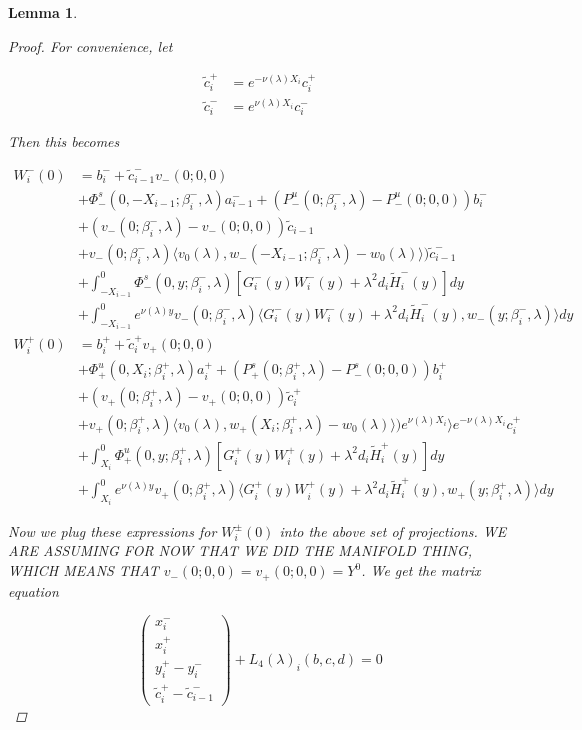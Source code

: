 \documentclass[12pt]{article}
\newtheorem{lemma}{Lemma}
\begin{document}
\begin{lemma}
\begin{proof}
For convenience, let

\begin{align*}
\tilde{c}_i^+ &= e^{-\nu(\lambda)X_i} c_i^+ \\ 
\tilde{c}_i^- &= e^{\nu(\lambda)X_i} c_i^-
\end{align*}

Then this becomes

\begin{align*}
W_i^-(0) &=  b_i^- + \tilde{c}_{i-1}^- v_-(0; 0, 0) \\
&+\Phi^s_-(0, -X_{i-1}; \beta_i^-, \lambda)a_{i-1}^- + (P^u_-(0; \beta_i^-, \lambda) - P^u_-(0; 0, 0))b_i^- \\
&+ (v_-(0; \beta_i^-, \lambda) - v_-(0; 0, 0)) \tilde{c}_{i-1} \\
&+ v_-(0; \beta_i^-, \lambda) \langle v_0(\lambda), w_-(-X_{i-1}; \beta_i^-, \lambda) - w_0(\lambda) \rangle ) \tilde{c}_{i-1}^- \\
&+ \int_{-X_{i-1}}^0 \Phi^s_-(0, y; \beta_i^-, \lambda) [ G_i^-(y)W_i^-(y) + \lambda^2 d_i \tilde{H}_i^-(y) ] dy \\
&+ \int_{-X_{i-1}}^0
e^{\nu(\lambda)y} v_-(0; \beta_i^-, \lambda) \langle G_i^-(y)W_i^-(y) + \lambda^2 d_i \tilde{H}_i^-(y), w_-(y; \beta_i^-, \lambda) \rangle dy \\
W_i^+(0) &= b_i^+ + \tilde{c}_i^+ v_+(0; 0, 0) \\
&+ \Phi^u_+(0, X_i; \beta_i^+, \lambda)a_i^+ + (P^s_+(0; \beta_i^+, \lambda) - P^s_-(0; 0, 0))b_i^+ \\
&+ (v_+(0; \beta_i^+, \lambda) - v_+(0; 0, 0)) \tilde{c}_i^+ \\
&+ v_+(0; \beta_i^+, \lambda) \langle v_0(\lambda), w_+(X_i; \beta_i^+, \lambda) - w_0(\lambda) \rangle ) e^{\nu(\lambda)X_i} \rangle e^{-\nu(\lambda) X_i} c_i^+ \\
&+ \int_{X_i}^0 \Phi^u_+(0, y; \beta_i^+, \lambda) [ G_i^+(y)W_i^+(y) + \lambda^2 d_i \tilde{H}_i^+(y) ] dy \\
&+ \int_{X_i}^0 e^{\nu(\lambda)y} v_+(0; \beta_i^+, \lambda) \langle G_i^+(y)W_i^+(y) + \lambda^2 d_i \tilde{H}_i^+(y), w_+(y; \beta_i^+, \lambda) \rangle dy
\end{align*}

Now we plug these expressions for $W_i^\pm(0)$ into the above set of projections. WE ARE ASSUMING FOR NOW THAT WE DID THE MANIFOLD THING, WHICH MEANS THAT $v_-(0; 0, 0) = v_+(0; 0, 0) = Y^0$. We get the matrix equation

\[
\begin{pmatrix}x_i^- \\ x_i^+ \\ 
y_i^+ - y_i^- \\ 
\tilde{c}_i^+ - \tilde{c}_{i-1}^- \end{pmatrix} + L_4(\lambda)_i(b, c, d) = 0
\]


\end{proof}
\end{lemma}
\end{document}
